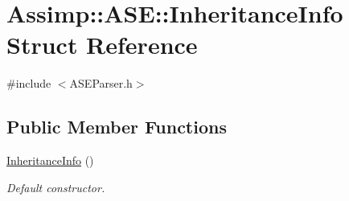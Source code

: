 \hypertarget{struct_assimp_1_1_a_s_e_1_1_inheritance_info}{\section{Assimp\+:\+:A\+S\+E\+:\+:Inheritance\+Info Struct Reference}
\label{struct_assimp_1_1_a_s_e_1_1_inheritance_info}
}


{\ttfamily \#include $<$A\+S\+E\+Parser.\+h$>$}

\subsection*{Public Member Functions}
\begin{DoxyCompactItemize}
\item 
\hypertarget{struct_assimp_1_1_a_s_e_1_1_inheritance_info_a85250bfc28e9f54a005000385ce54a95}{\hyperlink{struct_assimp_1_1_a_s_e_1_1_inheritance_info_a85250bfc28e9f54a005000385ce54a95}{Inheritance\+Info} ()}\label{struct_assimp_1_1_a_s_e_1_1_inheritance_info_a85250bfc28e9f54a005000385ce54a95}

\begin{DoxyCompactList}\small\item\em Default constructor. \end{DoxyCompactList}\end{DoxyCompactItemize}
